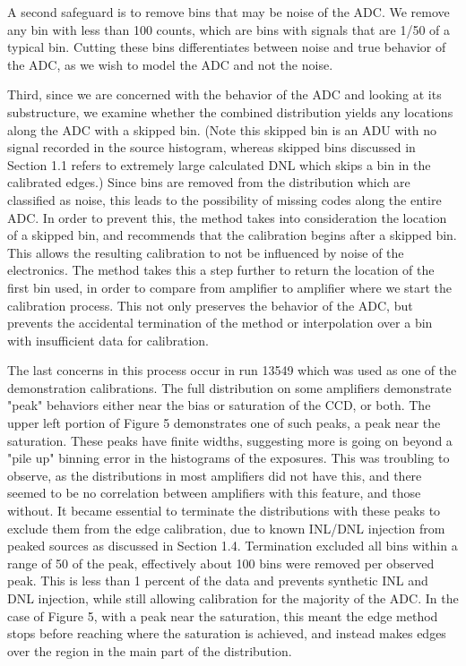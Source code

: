 \documentclass[11pt, letterpaper]{article}
\begin{document}
A second safeguard is to remove bins that may be noise of the ADC. 
We remove any bin with less than 100 counts, which are bins with signals that are 1/50 of a typical bin.
Cutting these bins differentiates between noise and true behavior of the ADC, as we wish to model the ADC and not the noise. 
\indent


Third, since we are concerned with the behavior of the ADC and looking at its substructure, we examine whether the combined distribution yields any locations along the ADC with a skipped bin. (Note this skipped bin is an ADU with no signal recorded in the source histogram, whereas skipped bins discussed in Section 1.1 refers to extremely large calculated DNL which skips a bin in the calibrated edges.)
Since bins are removed from the distribution which are classified as noise, this leads to the possibility of missing codes along the entire ADC. 
In order to prevent this, the method takes into consideration the location of a skipped bin, and recommends that the calibration begins after a skipped bin. 
This allows the resulting calibration to not be influenced by noise of the electronics. 
The method takes this a step further to return the location of the first bin used, in order to compare from amplifier to amplifier where we start the calibration process. 
This not only preserves the behavior of the ADC, but prevents the accidental termination of the method or interpolation over a bin with insufficient data for calibration. 
\indent 


The last concerns in this process occur in run 13549 which was used as one of the demonstration calibrations. 
The full distribution on some amplifiers demonstrate "peak" behaviors either near the bias or saturation of the CCD, or both.
The upper left portion of Figure 5 demonstrates one of such peaks, a peak near the saturation.  
These peaks have finite widths, suggesting more is going on beyond a "pile up" binning error in the histograms of the exposures. 
This was troubling to observe, as the distributions in most amplifiers did not have this, and there seemed to be no correlation between amplifiers with this feature, and those without. 
It became essential to terminate the distributions with these peaks to exclude them from the edge calibration, due to known INL/DNL injection from peaked sources as discussed in Section 1.4. 
Termination excluded all bins within a range of 50 of the peak, effectively about 100 bins were removed per observed peak. 
This is less than 1 percent of the data and prevents synthetic INL and DNL injection, while still allowing calibration for the majority of the ADC. 
In the case of Figure 5, with a peak near the saturation, this meant the edge method stops before reaching where the saturation is achieved, and instead makes edges over the region in the main part of the distribution. 
\indent
\end{document}
